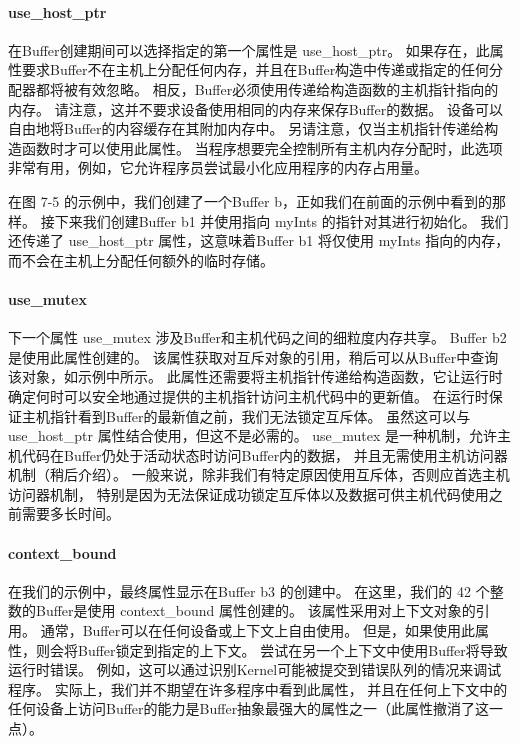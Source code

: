 \paragraph{use\_host\_ptr}

在Buffer创建期间可以选择指定的第一个属性是 use\_host\_ptr。 
如果存在，此属性要求Buffer不在主机上分配任何内存，并且在Buffer构造中传递或指定的任何分配器都将被有效忽略。 
相反，Buffer必须使用传递给构造函数的主机指针指向的内存。 请注意，这并不要求设备使用相同的内存来保存Buffer的数据。 
设备可以自由地将Buffer的内容缓存在其附加内存中。 另请注意，仅当主机指针传递给构造函数时才可以使用此属性。 
当程序想要完全控制所有主机内存分配时，此选项非常有用，例如，它允许程序员尝试最小化应用程序的内存占用量。

在图 7-5 的示例中，我们创建了一个Buffer b，正如我们在前面的示例中看到的那样。 
接下来我们创建Buffer b1 并使用指向 myInts 的指针对其进行初始化。 
我们还传递了 use\_host\_ptr 属性，这意味着Buffer b1 将仅使用 myInts 指向的内存，
而不会在主机上分配任何额外的临时存储。

\paragraph{use\_mutex}

下一个属性 use\_mutex 涉及Buffer和主机代码之间的细粒度内存共享。 Buffer b2 是使用此属性创建的。 
该属性获取对互斥对象的引用，稍后可以从Buffer中查询该对象，如示例中所示。 
此属性还需要将主机指针传递给构造函数，它让运行时确定何时可以安全地通过提供的主机指针访问主机代码中的更新值。 
在运行时保证主机指针看到Buffer的最新值之前，我们无法锁定互斥体。 
虽然这可以与 use\_host\_ptr 属性结合使用，但这不是必需的。 
use\_mutex 是一种机制，允许主机代码在Buffer仍处于活动状态时访问Buffer内的数据，
并且无需使用主机访问器机制（稍后介绍）。 
一般来说，除非我们有特定原因使用互斥体，否则应首选主机访问器机制，
特别是因为无法保证成功锁定互斥体以及数据可供主机代码使用之前需要多长时间。

\paragraph{context\_bound}

在我们的示例中，最终属性显示在Buffer b3 的创建中。 
在这里，我们的 42 个整数的Buffer是使用 context\_bound 属性创建的。 
该属性采用对上下文对象的引用。 通常，Buffer可以在任何设备或上下文上自由使用。 
但是，如果使用此属性，则会将Buffer锁定到指定的上下文。 尝试在另一个上下文中使用Buffer将导致运行时错误。 
例如，这可以通过识别Kernel可能被提交到错误队列的情况来调试程序。 
实际上，我们并不期望在许多程序中看到此属性，
并且在任何上下文中的任何设备上访问Buffer的能力是Buffer抽象最强大的属性之一（此属性撤消了这一点）。

